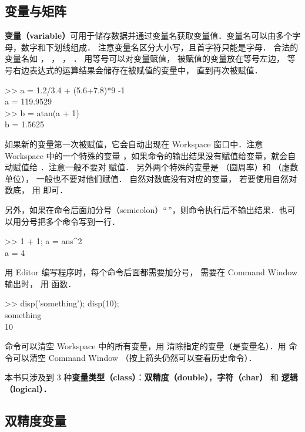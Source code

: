 

\subsection{变量与矩阵}
\textbf{变量（variable）}可用于储存数据并通过变量名获取变量值．变量名可以由多个字母，数字和下划线组成． 注意变量名区分大小写，且首字符只能是字母． 合法的变量名如 ， ， ， ． 用等号可以对变量赋值， 被赋值的变量放在等号左边， 等号右边表达式的运算结果会储存在被赋值的变量中， 直到再次被赋值．
\begin{Command}
>> a = 1.2/3.4 + (5.6+7.8)*9 -1 \\
a = 119.9529 \\
>> b = atan(a + 1) \\
b = 1.5625
\end{Command}
如果新的变量第一次被赋值，它会自动出现在 Workspace 窗口中．注意 Workspace 中的一个特殊的变量 ，如果命令的输出结果没有赋值给变量，就会自动赋值给 ．注意一般不要对  赋值． 另外两个特殊的变量是  （圆周率）和  （虚数单位）， 一般也不要对他们赋值． 自然对数底没有对应的变量， 若要使用自然对数底， 用  即可．

另外，如果在命令后面加分号（semicolon）“\,\x{;}”，则命令执行后不输出结果．也可以用分号把多个命令写到一行．
\begin{Command}
>> 1 + 1; a = ans\^{}2 \\
a = 4
\end{Command}
用 Editor 编写程序时，每个命令后面都需要加分号， 需要在 Command Window 输出时， 用  函数．
\begin{Command}
>> disp({\color{string}'something'}); disp(10);\\
something\\
10
\end{Command}

 命令可以清空 Workspace 中的所有变量，用  清除指定的变量（是变量名）．用  命令可以清空 Command Window （按上箭头仍然可以查看历史命令）．

本书只涉及到 3 种\textbf{变量类型（class）}：\textbf{双精度（double）}，\textbf{字符（char）} 和 \textbf{逻辑（logical）．}

\subsection{双精度变量}

